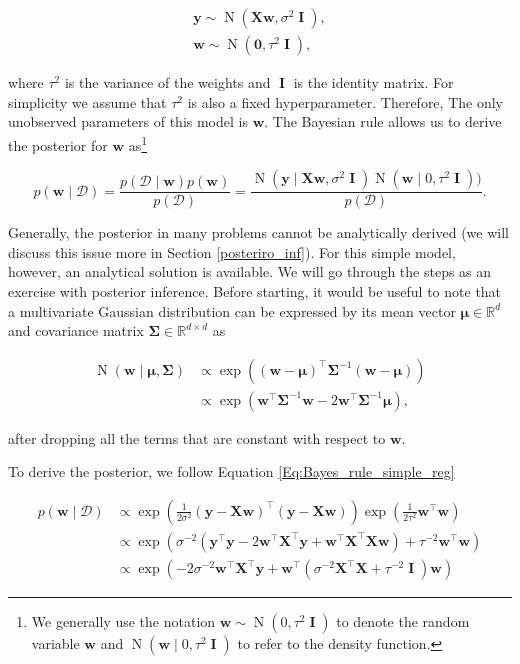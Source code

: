 \documentclass[dissertation,math,vertlayout,pdfa,colorlinks]{aaltoseries}
\newcommand{\bw}{\bm{w}}
\newcommand{\bX}{\bm{X}}
\newcommand{\by}{\bm{y}}
\newcommand{\bD}{\mathcal{D}}
\DeclareMathOperator{\eye}{\textbf{I}}
\DeclareMathOperator{\normalpdf}{N}
\newcommand{\tp}{^{\top}}
\begin{document}
\begin{align}\label{Eq:simple_Bayesian_regression} 
\by \sim \normalpdf(\bX\bw,\sigma^2 \eye),\\
\bw \sim \normalpdf(\textbf{0},\tau^2 \eye), \nonumber
\end{align}

\noindent where $\tau^2$ is the variance of the weights and $\eye$ is the identity matrix. For simplicity we assume that $\tau^2$ is also a fixed hyperparameter. Therefore, The only unobserved parameters of this model is $\bw$. The Bayesian rule allows us to derive the posterior for $\bw$ as\footnote{We generally use the notation $\bw \sim \normalpdf(0,\tau^2 \eye)$ to denote the random variable $\bw$ and $\normalpdf(\bw\mid 0,\tau^2 \eye)$ to refer to the density function.}

\begin{equation}\label{Eq:Bayes_rule_simple_reg}
p(\bw \mid \bD) = \frac{p(\bD \mid \bw)p(\bw)}{p(\bD)} = \frac{\normalpdf(\by \mid \bX \bw,\sigma^2 \eye) \normalpdf(\bw \mid 0,\tau^2 \eye))}{p(\bD)}.
\end{equation}  

Generally, the posterior in many problems cannot be analytically derived (we will discuss this issue more in Section \ref{posteriro_inf}). For this simple model, however, an analytical solution is available. We will go through the steps as an exercise with posterior inference. Before starting, it would be useful to note that a multivariate Gaussian distribution can be expressed by its mean vector $\bm{\mu}\in \mathbb{R}^d$ and covariance matrix $\bm{\Sigma}\in \mathbb{R}^{d \times d}$ as  

\begin{align}\label{Eq:multi_Gauss}
\normalpdf(\bw \mid \bm{\mu},\bm{\Sigma}) &\propto \exp \left ((\bw - \bm{\mu})\tp\bm{\Sigma}^{-1}(\bw - \bm{\mu}) \right) \nonumber\\
&\propto \exp \left ( \bw\tp\bm{\Sigma}^{-1}\bw -  2\bw\tp\bm{\Sigma}^{-1}\bm{\mu} \right),
\end{align}

\noindent after dropping all the terms that are constant with respect to $\bw$. 

To derive the posterior, we follow Equation \ref{Eq:Bayes_rule_simple_reg} 

\begin{align} \label{Eq:lin_rel_simple_derivation}
p(\bw \mid \bD) &\propto \exp \left(\frac{1}{2\sigma^2} (\by - \bX \bw)\tp(\by - \bX \bw)\right) \exp(\frac{1}{2\tau^2}\bw\tp\bw) \nonumber\\ 
&\propto \exp \left (\sigma^{-2}(\by\tp\by - 2\bw\tp\bX\tp\by + \bw\tp\bX\tp\bX\bw)+ \tau^{-2}\bw\tp\bw \right) \nonumber\\
&\propto \exp \left ( -2\sigma^{-2}\bw\tp\bX\tp\by + \bw\tp( \sigma^{-2}\bX\tp\bX + \tau^{-2} \eye )\bw \right) %
\end{align}    
 
\end{document}

